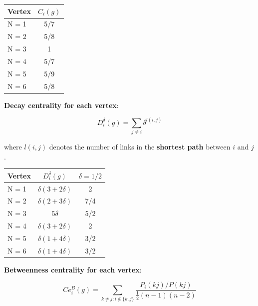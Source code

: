 \documentclass[a4paper]{article}
\begin{document}
\begin{table}[ht!]
	\centering
	 \label{tab:title} 
	\begin{tabular}{l@{\hskip 0.5in}c}
		Vertex & $C_i (g)$\\
		\hline\hline
		
		N = 1    &   5/7 \\
		N = 2   &  5/8 \\
		N = 3   &  1    \\
		N = 4   &  5/7 \\
		N = 5   &  5/9 \\
		N = 6   &  5/8 \\
		
		\bottomrule[1pt]
	\end{tabular}
\end{table}


\noindent \textbf{{\color{blue} Decay centrality for each vertex}}:

\begin{equation}
	D_i^\delta(g) = \sum_{j\ne i}\delta^{l(i,j)}
\end{equation}

where $l(i,j)$ denotes the number of links in the \textbf{shortest path} between $i$ and $j$. 

\begin{table}[ht!]
	\centering
	 \label{tab:title} 
	\begin{tabular}{l@{\hskip 0.5in}c@{\hskip 0.5in}c}
		Vertex & $D^\delta_i (g)$  & $\delta = 1/2$ \\
		\hline\hline
		
		N = 1    &  $\delta(3+2\delta)$ & 2 \\
		N = 2   &  $\delta(2+3\delta)$ & 7/4 \\
		N = 3   &  $5\delta$ &  5/2 \\
		N = 4   &  $\delta(3+2\delta)$ & 2\\
		N = 5   &  $\delta(1+4\delta)$ & 3/2 \\
		N = 6   &  $\delta(1+4\delta)$ & 3/2\\
		
		\bottomrule[1pt]
	\end{tabular}
\end{table}

\vspace{6cm}
\noindent \textbf{{\color{blue} Betweenness centrality for each vertex}}:

\begin{equation}
	Ce_i^B(g) = \sum_{k\ne j: i \not\in \{ k, j \}} \frac{P_i(kj)/P(kj)}{\frac{1}{2}(n-1)(n-2)}
\end{equation}
\end{document}
